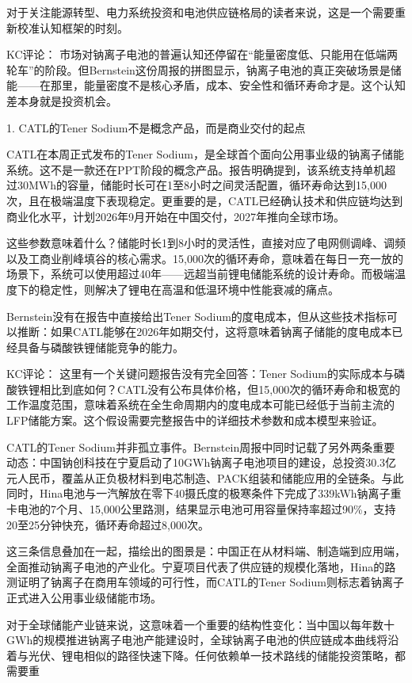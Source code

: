 \documentclass[11pt]{ctexart}
\begin{document}
对于关注能源转型、电力系统投资和电池供应链格局的读者来说，这是一个需要重新校准认知框架的时刻。

KC评论： 市场对钠离子电池的普遍认知还停留在“能量密度低、只能用在低端两轮车”的阶段。但Bernstein这份周报的拼图显示，钠离子电池的真正突破场景是储能——在那里，能量密度不是核心矛盾，成本、安全性和循环寿命才是。这个认知差本身就是投资机会。

1. CATL的Tener Sodium不是概念产品，而是商业交付的起点

CATL在本周正式发布的Tener Sodium，是全球首个面向公用事业级的钠离子储能系统。这不是一款还在PPT阶段的概念产品。报告明确提到，该系统支持单机超过30MWh的容量，储能时长可在1至8小时之间灵活配置，循环寿命达到15,000次，且在极端温度下表现稳定。更重要的是，CATL已经确认技术和供应链均达到商业化水平，计划2026年9月开始在中国交付，2027年推向全球市场。

这些参数意味着什么？储能时长1到8小时的灵活性，直接对应了电网侧调峰、调频以及工商业削峰填谷的核心需求。15,000次的循环寿命，意味着在每日一充一放的场景下，系统可以使用超过40年——远超当前锂电储能系统的设计寿命。而极端温度下的稳定性，则解决了锂电在高温和低温环境中性能衰减的痛点。

Bernstein没有在报告中直接给出Tener Sodium的度电成本，但从这些技术指标可以推断：如果CATL能够在2026年如期交付，这将意味着钠离子储能的度电成本已经具备与磷酸铁锂储能竞争的能力。

KC评论： 这里有一个关键问题报告没有完全回答：Tener Sodium的实际成本与磷酸铁锂相比到底如何？CATL没有公布具体价格，但15,000次的循环寿命和极宽的工作温度范围，意味着系统在全生命周期内的度电成本可能已经低于当前主流的LFP储能方案。这个假设需要完整报告中的详细技术参数和成本模型来验证。

CATL的Tener Sodium并非孤立事件。Bernstein周报中同时记载了另外两条重要动态：中国钠创科技在宁夏启动了10GWh钠离子电池项目的建设，总投资30.3亿元人民币，覆盖从正负极材料到电芯制造、PACK组装和储能应用的全链条。与此同时，Hina电池与一汽解放在零下40摄氏度的极寒条件下完成了339kWh钠离子重卡电池的7个月、15,000公里路测，结果显示电池可用容量保持率超过90\%，支持20至25分钟快充，循环寿命超过8,000次。

这三条信息叠加在一起，描绘出的图景是：中国正在从材料端、制造端到应用端，全面推动钠离子电池的产业化。宁夏项目代表了供应链的规模化落地，Hina的路测证明了钠离子在商用车领域的可行性，而CATL的Tener Sodium则标志着钠离子正式进入公用事业级储能市场。

对于全球储能产业链来说，这意味着一个重要的结构性变化：当中国以每年数十GWh的规模推进钠离子电池产能建设时，全球钠离子电池的供应链成本曲线将沿着与光伏、锂电相似的路径快速下降。任何依赖单一技术路线的储能投资策略，都需要重
\end{document}

